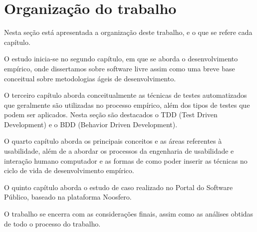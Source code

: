 \section{Organização do trabalho}

Nesta seção está apresentada a organização deste trabalho, e o que se refere cada capítulo.

O estudo inicia-se no segundo capítulo, em que se aborda o desenvolvimento empírico, onde dissertamos sobre software livre assim como uma breve base conceitual sobre metodologias ágeis de desenvolvimento.

O terceiro capítulo aborda conceitualmente as técnicas de testes automatizados que geralmente são utilizadas no processo empírico, além dos tipos de testes que podem ser aplicados. Nesta seção são destacados o TDD (Test Driven Development) e o BDD (Behavior Driven Development).

O quarto capítulo aborda os principais conceitos e as áreas referentes à usabilidade, além de a abordar os processos da engenharia de usabilidade e interação humano computador e as formas de como poder inserir as técnicas no ciclo de vida de desenvolvimento empírico.

O quinto capítulo aborda o estudo de caso realizado no Portal do Software Público, baseado na plataforma Noosfero.

O trabalho se encerra com as considerações finais, assim como as análises obtidas de todo o processo do trabalho.



